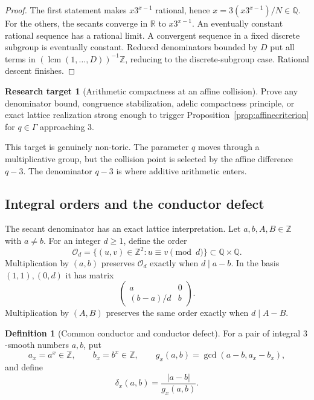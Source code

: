 \documentclass[11pt,oneside]{article}
\theoremstyle{definition}
\newtheorem{definition}[theorem]{Definition}
\newtheorem{target}[theorem]{Research target}
\theoremstyle{remark}
\newcommand{\Z}{\mathbb Z}
\newcommand{\Q}{\mathbb Q}
\newcommand{\R}{\mathbb R}
\newcommand{\lcm}{\operatorname{lcm}}
\newcommand{\cO}{\mathcal O}
\begin{document}
\begin{proof}
The first statement makes $x3^{x-1}$ rational, hence
$x=3(x3^{x-1})/N\in\Q$.  For the others, the secants converge in $\R$ to
$x3^{x-1}$.  An eventually constant rational sequence has a rational limit.  A convergent
sequence in a fixed discrete subgroup is eventually constant.  Reduced denominators bounded
by $D$ put all terms in $(\lcm(1,\dots,D))^{-1}\Z$, reducing to the discrete-subgroup case.
Rational descent finishes.
\end{proof}

\begin{target}[Arithmetic compactness at an affine collision]
\label{target:affinecompactness}
Prove any denominator bound, congruence stabilization, adelic compactness principle, or exact
lattice realization strong enough to trigger Proposition~\ref{prop:affinecriterion} for
$q\in\Gamma$ approaching $3$.
\end{target}

This target is genuinely non-toric.  The parameter $q$ moves through a multiplicative group,
but the collision point is selected by the affine difference $q-3$.  The denominator
$q-3$ is where additive arithmetic enters.

\subsection{Integral orders and the conductor defect}

The secant denominator has an exact lattice interpretation.  Let $a,b,A,B\in\Z$ with
$a\ne b$.  For an integer $d\ge1$, define the order
\begin{equation}
 \cO_d=\{(u,v)\in\Z^2:u\equiv v\pmod d\}\subset\Q\times\Q.
 \label{eq:Od}
\end{equation}
Multiplication by $(a,b)$ preserves $\cO_d$ exactly when $d\mid a-b$.  In the basis
$(1,1),(0,d)$ it has matrix
\begin{equation}
 \begin{pmatrix}
 a&0\\(b-a)/d&b
 \end{pmatrix}.
 \label{eq:orderaction}
\end{equation}
Multiplication by $(A,B)$ preserves the same order exactly when $d\mid A-B$.

\begin{definition}[Common conductor and conductor defect]
For a pair of integral $3$-smooth numbers $a,b$, put
\begin{equation}
 a_x=a^x\in\Z,
 \qquad b_x=b^x\in\Z,
 \qquad
 g_x(a,b)=\gcd(a-b,a_x-b_x),
 \label{eq:commonconductor}
\end{equation}
and define
\begin{equation}
 \delta_x(a,b)=\frac{|a-b|}{g_x(a,b)}.
 \label{eq:conductordefect}
\end{equation}
\end{definition}
\end{document}

